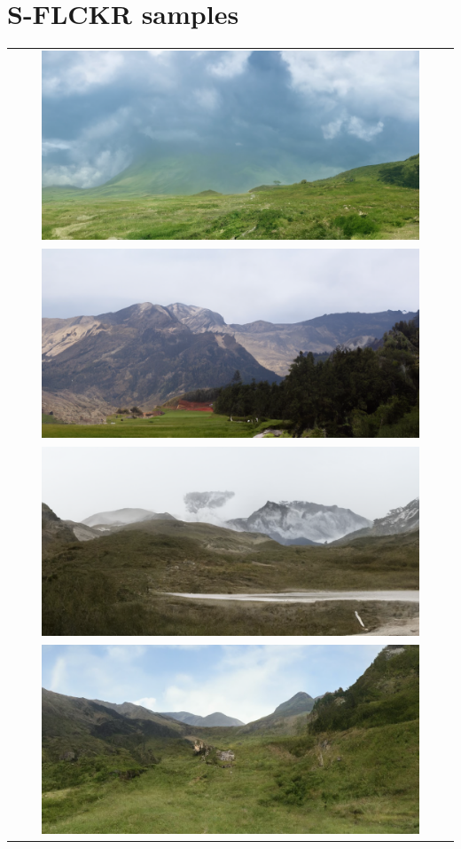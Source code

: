 \section{S-FLCKR samples}

\begin{longtable}{c} \label{tab:a2}
    \includegraphics[width=0.87\textwidth]{Chapters/figures/appendix/flickr/21_uncond_sample.png} \\
    \includegraphics[width=0.87\textwidth]{Chapters/figures/appendix/flickr/7_uncond_sample.png} \\
    \includegraphics[width=0.87\textwidth]{Chapters/figures/appendix/flickr/5_uncond_sample.png} \\
    \includegraphics[width=0.87\textwidth]{Chapters/figures/appendix/flickr/0_uncond_sample.png} \\

\end{longtable}

